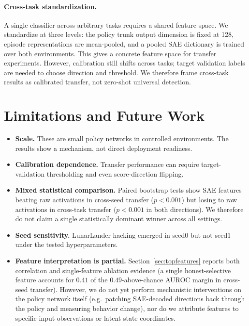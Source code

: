 \documentclass[11pt]{article}
\begin{document}
\paragraph{Cross-task standardization.}
A single classifier across arbitrary tasks requires a shared feature space. We standardize at three levels: the policy trunk output dimension is fixed at 128, episode representations are mean-pooled, and a pooled SAE dictionary is trained over both environments. This gives a concrete feature space for transfer experiments. However, calibration still shifts across tasks; target validation labels are needed to choose direction and threshold. We therefore frame cross-task results as calibrated transfer, not zero-shot universal detection.

\section{Limitations and Future Work}

\begin{itemize}
  \item \textbf{Scale.} These are small policy networks in controlled environments. The results show a mechanism, not direct deployment readiness.
  \item \textbf{Calibration dependence.} Transfer performance can require target-validation thresholding and even score-direction flipping.
  \item \textbf{Mixed statistical comparison.} Paired bootstrap tests show SAE features beating raw activations in cross-seed transfer ($p<0.001$) but losing to raw activations in cross-task transfer ($p<0.001$ in both directions). We therefore do not claim a single statistically dominant winner across all settings.
  \item \textbf{Seed sensitivity.} LunarLander hacking emerged in seed0 but not seed1 under the tested hyperparameters.
  \item \textbf{Feature interpretation is partial.} Section~\ref{sec:topfeatures} reports both correlation and single-feature ablation evidence (a single honest-selective feature accounts for $0.41$ of the $0.49$-above-chance AUROC margin in cross-seed transfer). However, we do not yet perform mechanistic interventions on the policy network itself (e.g.\ patching SAE-decoded directions back through the policy and measuring behavior change), nor do we attribute features to specific input observations or latent state coordinates.
\end{itemize}
\end{document}
